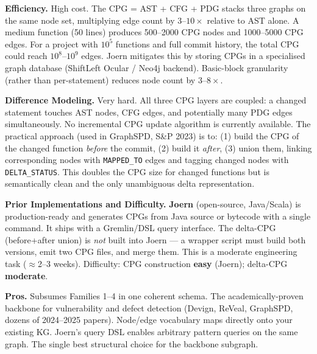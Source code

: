 \documentclass[12pt,a4paper]{article}
\begin{document}
\begin{effbox}
\textbf{Efficiency.}
High cost. The CPG = AST + CFG + PDG stacks three graphs on the same node set,
multiplying edge count by $3$--$10\times$ relative to AST alone. A medium
function (50 lines) produces 500--2000 CPG nodes and 1000--5000 CPG edges.
For a project with $10^5$ functions and full commit history, the total CPG
could reach $10^8$--$10^9$ edges. Joern mitigates this by storing CPGs in a
specialised graph database (ShiftLeft Ocular / Neo4j backend). Basic-block
granularity (rather than per-statement) reduces node count by $3$--$8\times$.
\end{effbox}

\begin{diffbox}
\textbf{Difference Modeling.}
Very hard. All three CPG layers are coupled: a changed statement touches AST
nodes, CFG edges, and potentially many PDG edges simultaneously. No incremental
CPG update algorithm is currently available. The practical approach (used in
GraphSPD, S\&P 2023) is to: (1) build the CPG of the changed function
\emph{before} the commit, (2) build it \emph{after}, (3) union them, linking
corresponding nodes with \texttt{MAPPED\_TO} edges and tagging changed nodes
with \texttt{DELTA\_STATUS}. This doubles the CPG size for changed functions
but is semantically clean and the only unambiguous delta representation.
\end{diffbox}

\begin{implbox}
\textbf{Prior Implementations and Difficulty.}
\textbf{Joern} (open-source, Java/Scala) is production-ready and generates CPGs
from Java source or bytecode with a single command. It ships with a Gremlin/DSL
query interface. The delta-CPG (before+after union) is \emph{not} built into
Joern --- a wrapper script must build both versions, emit two CPG files, and
merge them. This is a moderate engineering task ($\approx$2--3 weeks).
Difficulty: CPG construction \textbf{easy} (Joern); delta-CPG
\textbf{moderate}.
\end{implbox}

\begin{prosbox}
\textbf{Pros.}
Subsumes Families 1--4 in one coherent schema. The academically-proven
backbone for vulnerability and defect detection (Devign, ReVeal, GraphSPD,
dozens of 2024--2025 papers). Node/edge vocabulary maps directly onto your
existing KG. Joern's query DSL enables arbitrary pattern queries on the same
graph. The single best structural choice for the backbone subgraph.
\end{prosbox}
\end{document}
